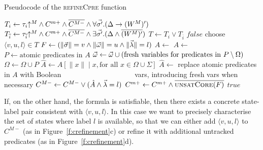 \begin{algorithm}[t]

\caption{Pseudocode of the \textsc{refineCpre} function}
\label{alg:refineCpre}
\begin{algorithmic}[1]
    \State {}
    \State $T_i         \gets \tau_i\mathord{\uparrow^M} \land C^{m+} \label{a:refineCpre:cstart}
    \land {\overline{C^{M-}}} \land \forall \vec{\sigma'}. (\Delta \rightarrow (W^M)')$
    \State {}
    \State $T_{\overline{i}} \gets \tau_{\overline{i}}\mathord{\uparrow^M} \land C^{m+} \land {\overline{C^{M-}}} \land \exists \vec{\sigma'}. (\Delta \land \overline{(W^M)'})$
    \State $T           \gets T_i \lor T_{\overline{i}}$\label{a:refineCpre:cend}
        \Return $false$ 
    \Else
    \State choose $\langle v,u,l\rangle \in T$ \label{a:refineCpre:pickSat}
        \State $F \gets (\|\vec{\sigma}\|=v \land \|\vec{\omega}\|=u \land \|\vec{\lambda}\|=l)$
         \label{a:refineCpre:sat}
        \State $A             \gets $  \label{a:refineCpre:quant} \label{a:refineCpre:addLabel_start}
            \State $A             \gets $  \label{a:refineCpre:a_end}
            \State $P             \gets \text{atomic predicates in }A$ \label{a:refineCpre:atomic}
            \State $\vec{\omega} \gets \vec{\omega} \cup (\text{fresh variables for predicates in } P\setminus\Omega)$
            \State $\Omega        \gets \Omega \cup P$
            \State $\hat{A}       \gets A[\|x\|\mid x, \text{for all } x\in\Omega \cup \Sigma ]$
            \State $\hat{A}       \gets$ replace atomic predicates in $A$ with Boolean
            \Statex  ~~~~~~~~~~~~~~~~~~~~vars, introducing fresh vars when necessary
            \State $C^{M-}        \gets C^{M-} \lor (\hat{A}\land \vec{\lambda}=l)$ \label{a:refineCpre:addLabel_end}
        \Else
            \State $C^{m+}\gets C^{m+} \land \overline{\textsc{unsatCore}(F)}$ \label{a:refineCpre:core}%
        \EndIf
        \State \Return $true$
    \EndIf
\EndFunction
\end{algorithmic}
\end{algorithm}

If, on the other hand, the formula is satisfiable, then there exists a concrete state-label pair consistent with $\langle v,u,l\rangle$.  In this case we want to precisely characterise the set of states where label $l$ is available, so that we can either add $\langle v,u,l\rangle$ to $C^{M-}$ (as in Figure~\ref{f:crefinement}c) or refine it with additional untracked predicates (as in Figure~\ref{f:crefinement}d).


